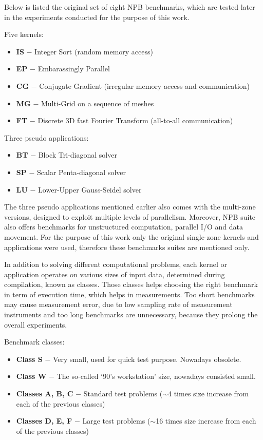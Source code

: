 Below is listed the original set of eight NPB benchmarks, which are tested later in the
experiments conducted for the purpose of this work.

Five kernels:
\begin{itemize}
    \item \textbf{IS} $-$ Integer Sort (random memory access)
    \item \textbf{EP} $-$ Embarassingly Parallel
    \item \textbf{CG} $-$ Conjugate Gradient (irregular memory access and communication)
    \item \textbf{MG} $-$ Multi-Grid on a sequence of meshes
    \item \textbf{FT} $-$ Discrete 3D fast Fourier Transform (all-to-all communication)
\end{itemize}

Three pseudo applications:
\begin{itemize}
    \item \textbf{BT} $-$ Block Tri-diagonal solver
    \item \textbf{SP} $-$ Scalar Penta-diagonal solver
    \item \textbf{LU} $-$ Lower-Upper Gauss-Seidel solver
\end{itemize}

The three pseudo applications mentioned earlier also comes with the multi-zone
versions, designed to exploit multiple levels of parallelism. Moreover, NPB
suite also offers benchmarks for unstructured computation, parallel I/O and
data movement. For the purpose of this work only the original single-zone
kernels and applications were used, therefore these benchmarks suites are
mentioned only.

In addition to solving different computational problems, each kernel or
application operates on various sizes of input data, determined during
compilation, known as classes. Those classes helps choosing the right benchmark
in term of execution time, which helps in measurements. Too short benchmarks may
cause measurement error, due to low sampling rate of measurement instruments and
too long benchmarks are unnecessary, because they prolong the overall experiments.

Benchmark classes:
\begin{itemize}
    \item \textbf{Class S} $-$ Very small, used for quick test purpose. Nowadays obsolete.
    \item \textbf{Class W} $-$ The so-called `90's workstation' size, nowadays consisted small.
    \item \textbf{Classes A, B, C} $-$ Standard test problems ($\sim$4 times size increase from
    each of the previous classes)
    \item \textbf{Classes D, E, F} $-$ Large test problems ($\sim$16 times size increase from
    each of the previous classes)
\end{itemize}


